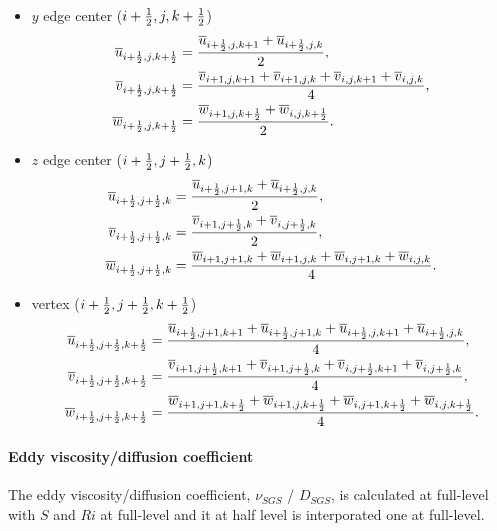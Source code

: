 \begin{itemize}
  \item $y$ edge center ($i+\frac{1}{2},j,k+\frac{1}{2}$)
    \begin{align}
      \overline{u}_{i+\frac{1}{2},j,k+\frac{1}{2}} &=
      \frac{\overline{u}_{i+\frac{1}{2},j,k+1}+\overline{u}_{i+\frac{1}{2},j,k}}{2}, \\
      \overline{v}_{i+\frac{1}{2},j,k+\frac{1}{2}} &=
      \frac{\overline{v}_{i+1,j,k+1}+\overline{v}_{i+1,j,k}+\overline{v}_{i,j,k+1}+\overline{v}_{i,j,k}}{4}, \\
      \overline{w}_{i+\frac{1}{2},j,k+\frac{1}{2}} &=
      \frac{\overline{w}_{i+1,j,k+\frac{1}{2}}+\overline{w}_{i,j,k+\frac{1}{2}}}{2}.
    \end{align}

  \item $z$ edge center ($i+\frac{1}{2},j+\frac{1}{2},k$)
    \begin{align}
      \overline{u}_{i+\frac{1}{2},j+\frac{1}{2},k} &=
      \frac{\overline{u}_{i+\frac{1}{2},j+1,k}+\overline{u}_{i+\frac{1}{2},j,k}}{2}, \\
      \overline{v}_{i+\frac{1}{2},j+\frac{1}{2},k} &=
      \frac{\overline{v}_{i+1,j+\frac{1}{2},k}+\overline{v}_{i,j+\frac{1}{2},k}}{2}, \\
      \overline{w}_{i+\frac{1}{2},j+\frac{1}{2},k} &=
      \frac{\overline{w}_{i+1,j+1,k}+\overline{w}_{i+1,j,k}+\overline{w}_{i,j+1,k}+\overline{w}_{i,j,k}}{4}.
    \end{align}

  \item vertex ($i+\frac{1}{2},j+\frac{1}{2},k+\frac{1}{2}$)
    \begin{align}
      \overline{u}_{i+\frac{1}{2},j+\frac{1}{2},k+\frac{1}{2}} &=
      \frac{\overline{u}_{i+\frac{1}{2},j+1,k+1}+\overline{u}_{i+\frac{1}{2},j+1,k}+\overline{u}_{i+\frac{1}{2},j,k+1}+\overline{u}_{i+\frac{1}{2},j,k}}{4}, \\
      \overline{v}_{i+\frac{1}{2},j+\frac{1}{2},k+\frac{1}{2}} &=
      \frac{\overline{v}_{i+1,j+\frac{1}{2},k+1}+\overline{v}_{i+1,j+\frac{1}{2},k}+\overline{v}_{i,j+\frac{1}{2},k+1}+\overline{v}_{i,j+\frac{1}{2},k}}{4}, \\
      \overline{w}_{i+\frac{1}{2},j+\frac{1}{2},k+\frac{1}{2}} &=
      \frac{\overline{w}_{i+1,j+1,k+\frac{1}{2}}+\overline{w}_{i+1,j,k+\frac{1}{2}}+\overline{w}_{i,j+1,k+\frac{1}{2}}+\overline{w}_{i,j,k+\frac{1}{2}}}{4}.
    \end{align}
\end{itemize}

\paragraph{Eddy viscosity/diffusion coefficient}
The eddy viscosity/diffusion coefficient, $\nu_{SGS}$ / $D_{SGS}$, is calculated at full-level with $S$ and $Ri$ at full-level and it at half level is interporated one at full-level.


